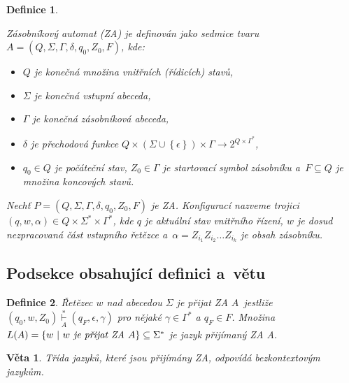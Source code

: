 \documentclass[hidelinks ,twoside, 11pt ,twocolumn, a4paper]{article}
\newtheorem{definition}{Definice}
\newtheorem{theorem}{Věta}
\begin{document}
\begin{definition}
\label{definice1}
{\upshape
Zásobníkový automat \textit{(ZA) je definován jako sedmice tvaru} 
$A = (Q, \Sigma, \Gamma, \delta, q_0, Z_0, F)$, kde: 

\begin{itemize}

\item $Q$ \textit{je konečná množina} vnitřních (řídicích) stavů,
\item $\Sigma$ \textit{je konečná} vstupní abeceda,
\item $\Gamma$ \textit{je konečná} zásobníková abeceda,
\item $\delta$ je přechodová funkce $Q \times (\Sigma \cup \left\{ \epsilon\right\}) \times \Gamma \rightarrow 2^{Q \times \Gamma^*}$,
\item $q_0 \in Q$ je počáteční stav, $Z_0 \in \Gamma$ je startovací symbol zásobníku \textit{a~$F \subseteq Q$ je množina} koncových stavů.
\end{itemize}

Nechť $P = (Q, \Sigma, \Gamma, \delta, q_0, Z_0, F)$ je ZA. \textit{Konfigurací} nazveme trojici $(q, w, \alpha) \in Q \times \Sigma^* \times \Gamma^*$, kde $q$ je aktuální stav vnitřního řízení, $w$ je dosud nezpracovaná část vstupního řetězce a~$\alpha = Z_{i_{1}} Z_{i_{2}} \dots Z_{i_{k}}$ je obsah zásobníku.

}
\end{definition}

\subsection{Podsekce obsahující definici a~větu}
\begin{definition}
    {\upshape Řetězec $w$ nad abecedou $\Sigma$ je přijat ZA $A$~\textit{jestliže $(q_0, w, Z_0) \overset{*}{\underset{A}{\vdash}} (q_F, \epsilon, \gamma)$ pro nějaké $\gamma \in \Gamma^*$ a $q_F \in F$. Množina $L(A) = \{ w\ |\ w \text{\textit{ je přijat ZA }}A\} \subseteq \Sigma^*$ je} jazyk přijímaný ZA \textit{A}.
    }
\end{definition}

\begin{theorem}
Třída jazyků, které jsou přijímány ZA, odpovídá {\upshape bezkontextovým jazykům.}
\end{theorem}
\end{document}
